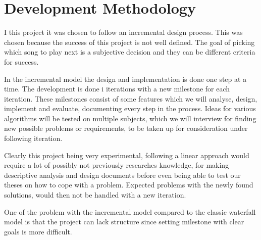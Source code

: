 \chapter{Development Methodology}

I this project it was chosen to follow an incremental design process. This was chosen because the success of this project is not well defined. The goal of picking which song to play next is a subjective decision and they can be different criteria for success.

In the incremental model the design and implementation is done one step at a time. The development is done i iterations with a new milestone for each iteration. These milestones consist of some features which we will analyse, design, implement and evaluate, documenting every step in the process. Ideas for various algorithms will be tested on multiple subjects, which we will interview for finding new possible problems or requirements, to be taken up for consideration under following iteration.

Clearly this project being very experimental, following a linear approach would require a lot of possibly not previously researches knowledge, for making descriptive analysis and design documents before even being able to test our theses on how to cope with a problem. Expected problems with the newly found solutions, would then not be handled with a new iteration.

One of the problem with the incremental model compared to the classic waterfall model is that the project can lack structure since setting milestone with clear goals is more difficult.
